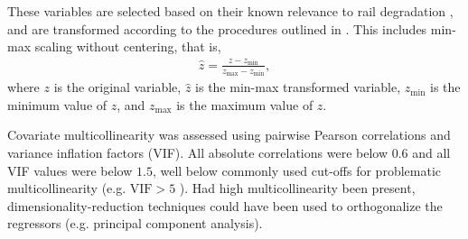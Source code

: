 These variables are selected based on their known relevance to rail degradation \citep{ghofrani2019a,dick2003a,UIC_2002_defecthandbook,RASMUSSEN20178}, and are transformed according to the procedures outlined in \citet{bisgaard2024A}. This includes min-max scaling without centering, that is,
\begin{align*}
    \widehat{z} = \frac{z - z_{\text{min}}}{z_{\text{max}} - z_{\text{min}}},
\end{align*}
where $z$ is the original variable, $\widehat{z}$ is the min-max transformed variable, $z_{\text{min}}$ is the minimum value of $z$, and $z_{\text{max}}$ is the maximum value of $z$. 

Covariate multicollinearity was assessed using pairwise Pearson correlations and variance inflation factors (VIF). All absolute correlations were below $0.6$ and all VIF values were below $1.5$, well below commonly used cut-offs for problematic multicollinearity (e.g. $\text{VIF} > 5$ \citep[Sec. 6.4.1]{sheather2009a}).
Had high multicollinearity been present, dimensionality-reduction techniques could have been used to orthogonalize the regressors (e.g. principal component analysis).









